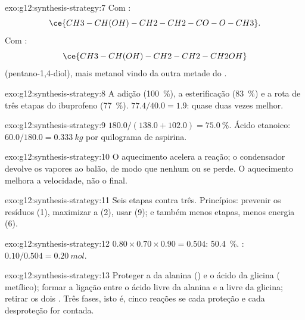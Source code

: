 \begin{solution}{exo:g12:synthesis-strategy:7}
Com :
\[ \ce{CH3-CH(OH)-CH2-CH2-CO-O-CH3} . \]
Com :
\[ \ce{CH3-CH(OH)-CH2-CH2-CH2OH} \]
(pentano-1,4-diol), mais metanol vindo da outra metade do .
\end{solution}

\begin{solution}{exo:g12:synthesis-strategy:8}
A adição (\qty{100}{\percent}), a esterificação
(\qty{83}{\percent}) e a rota de três etapas do ibuprofeno
(\qty{77}{\percent}). $77.4/40.0 = 1.9$: quase duas vezes melhor.
\end{solution}

\begin{solution}{exo:g12:synthesis-strategy:9}
$180.0/(138.0 + 102.0) = \qty{75.0}{\percent}$. Ácido etanoico:
$60.0/180.0 = \qty{0.333}{kg}$ por quilograma de aspirina.
\end{solution}

\begin{solution}{exo:g12:synthesis-strategy:10}
O aquecimento acelera a reação; o condensador devolve os vapores ao
balão, de modo que nenhum  ou  se perde. O aquecimento
melhora a velocidade, não o  final.
\end{solution}

\begin{solution}{exo:g12:synthesis-strategy:11}
Seis etapas contra três. Princípios: prevenir os resíduos (1), maximizar
a  (2), usar  (9); e também menos etapas,
menos energia (6).
\end{solution}

\begin{solution}{exo:g12:synthesis-strategy:12}
$0.80 \times 0.70 \times 0.90 = 0.504$: \qty{50.4}{\percent}.
: $0.10/0.504 = \qty{0.20}{mol}$.
\end{solution}

\begin{solution}{exo:g12:synthesis-strategy:13}
Proteger a  da alanina () e o ácido da glicina (
metílico); formar a ligação  entre o ácido livre da alanina e a
 livre da glicina; retirar os dois . Três fases,
isto é, cinco reações se cada proteção e cada desproteção for contada.
\end{solution}

